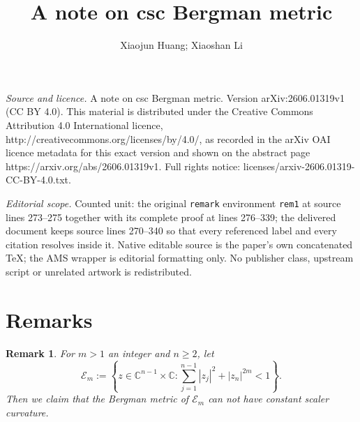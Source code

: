 \documentclass[10pt,a4paper]{amsart}
\newtheorem{remark}[theorem]{Remark}
\numberwithin{equation}{section}
\begin{document}
\title[A note on csc Bergman metric]{A note on csc Bergman metric}
\author{Xiaojun Huang; Xiaoshan Li}
\date{}
\maketitle
\noindent\emph{Source and licence.} A note on csc Bergman metric. Version arXiv:2606.01319v1 (CC BY 4.0). This material is distributed under the Creative Commons Attribution 4.0 International licence, http://creativecommons.org/licenses/by/4.0/, as recorded in the arXiv OAI licence metadata for this exact version and shown on the abstract page https://arxiv.org/abs/2606.01319v1. Full rights notice: licenses/arxiv-2606.01319-CC-BY-4.0.txt.\par\smallskip
\noindent\textit{Editorial scope.} Counted unit: the original \texttt{remark} environment \texttt{rem1} at source lines 273--275 together with its complete proof at lines 276--339; the delivered document keeps source lines 270--340 so that every referenced label and every citation resolves inside it. Native editable source is the paper's own concatenated TeX; the AMS wrapper is editorial formatting only. No publisher class, upstream script or unrelated artwork is redistributed.
\section{Remarks}


\begin{remark}\label{rem1}
    For $m>1$ an integer  and $n\geq 2$, let $$\mathcal E_m:=\left\{z\in\mathbb C^{n-1}\times \mathbb C:\sum_{j=1}^{n-1}|z_j|^2+|z_n|^{2m}<1\right\}.$$ Then we claim that the Bergman metric of $\mathcal E_m$ can not have constant scaler curvature.
\end{remark}
\end{document}
